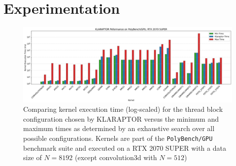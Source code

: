 \section{Experimentation}

\begin{frame}[fragile]{}
    \begin{figure}[t!]
        \includegraphics[width=\textwidth, trim={0em, 0.9em, 0em, 0em}, clip]{figures/MinMaxTimes-RTX-8192.png}
        \caption{Comparing kernel execution time (log-scaled) for the thread block configuration chosen by KLARAPTOR
            versus the minimum and maximum times as determined by an exhaustive search over all possible configurations. 
            Kernels are part of the \texttt{PolyBench/GPU} benchmark suite and executed on a RTX 2070 SUPER with a data 
            size of $N=8192$ (except convolution3d with $N=512$)}
    \end{figure}
\end{frame}

\begin{frame}[fragile]{}
    
\end{frame}

